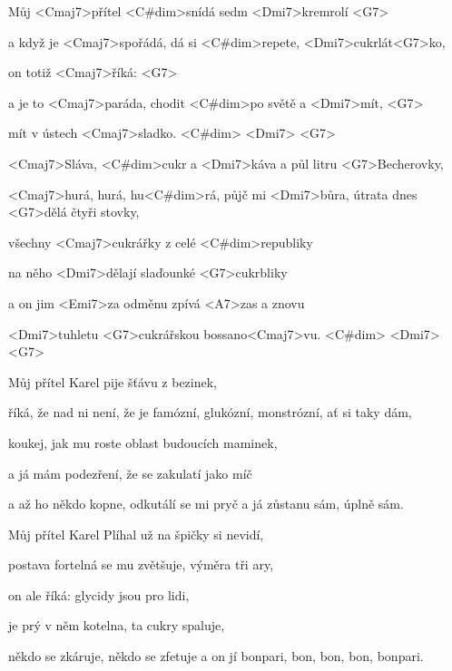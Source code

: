 

\zs
Můj <Cmaj7>přítel <C#dim>snídá sedm <Dmi7>kremrolí <G7>

a když je <Cmaj7>spořádá, dá si <C#dim>repete, <Dmi7>cukrlát<G7>ko,

on totiž <Cmaj7>říká:  <G7>

a je to <Cmaj7>paráda, chodit <C#dim>po světě a <Dmi7>mít, <G7>

mít v ústech <Cmaj7>sladko. <C#dim> <Dmi7> <G7>
\ks


\zr
<Cmaj7>Sláva, <C#dim>cukr a <Dmi7>káva a půl litru 
<G7>Becherovky,

<Cmaj7>hurá, hurá, hu<C#dim>rá, půjč mi <Dmi7>bůra, útrata dnes 
<G7>dělá čtyři stovky,

všechny <Cmaj7>cukrářky z celé <C#dim>republiky

na něho <Dmi7>dělají slaďounké <G7>cukrbliky

a on jim <Emi7>za odměnu zpívá <A7>zas a znovu

<Dmi7>tuhletu <G7>cukrářskou bossano<Cmaj7>vu. <C#dim> <Dmi7> <G7>
\kr

\zs
Můj přítel Karel pije šťávu z bezinek,

říká, že nad ni není, že je famózní, glukózní, monstrózní, ať si taky dám,

koukej, jak mu roste oblast budoucích maminek,

a já mám podezření, že se zakulatí jako míč

a až ho někdo kopne, odkutálí se mi pryč a já zůstanu sám, úplně sám.
\ks

\zr \kr

\zs
Můj přítel Karel Plíhal už na špičky si nevidí,

postava fortelná se mu zvětšuje, výměra tři ary,

on ale říká: glycidy jsou pro lidi,

je prý v něm kotelna, ta cukry spaluje,

někdo se zkáruje, někdo se zfetuje a on jí bonpari, bon, bon, bon, bonpari.
\ks

\zr \kr

\kp
